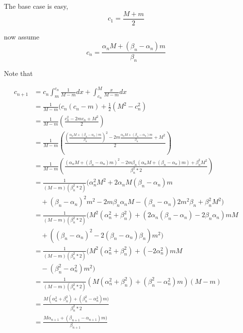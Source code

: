 \documentclass[12pt]{exam}
\begin{document}
\begin{questions}
\begin{enumerate}
\begin{solution}
The base case is easy,
\[c_1 = \frac{M + m}{2}\]

now assume 
\[c_n = \frac{\alpha_n M + (\beta_n - \alpha_n) m}{\beta_n}\]

Note that 
\end{solution}
\begin{solution}

\begin{align*}
    c_{n+1} &= c_{n}\int_{m}^{c_{n}} \frac{1}{M-m} dx + \int_{c_{n}}^M \frac{x}{M-m} dx\\
    &= \frac{1}{M-m}(c_{n}(c_{n} - m)  + \frac{1}{2}(M^2 - c_n^2) \\
    &= \frac{1}{M-m}(\frac{c_{n}^2 - 2m c_n + M^2}{2}) \\
    &= \frac{1}{M-m}(\frac{(\frac{\alpha_n M + (\beta_n - \alpha_n) m}{\beta_n})^2 - 2m \frac{\alpha_n M + (\beta_n - \alpha_n) m}{\beta_n} + M^2}{2}) \\
    &= \frac{1}{M-m}(\frac{(\alpha_n M + (\beta_n - \alpha_n) m)^2 - 2m \beta_n (\alpha_n M + (\beta_n - \alpha_n) m) + \beta_n^2 M^2}{\beta_n^2 * 2}) \\
    &= \frac{1}{(M-m)(\beta_n^2 * 2)}(\alpha_n^2 M^2 + 2\alpha_n M (\beta_n - \alpha_n) m\\
    &\quad +  (\beta_n - \alpha_n)^2 m^2 - 2m \beta_n \alpha_n M - (\beta_n - \alpha_n) 2m^2 \beta_n + \beta_n^2 M^2) \\
    &= \frac{1}{(M-m)(\beta_n^2 * 2)}(M^2(\alpha_n^2 + \beta_n^2) + (2\alpha_n (\beta_n - \alpha_n) - 2\beta_n \alpha_n )m M \\
    &\quad + ((\beta_n - \alpha_n)^2 - 2(\beta_n - \alpha_n)  \beta_n)m^2) \\
    &= \frac{1}{(M-m)(\beta_n^2 * 2)}(M^2(\alpha_n^2 + \beta_n^2) + (- 2\alpha_n^2 )m M \\
    &\quad - (\beta_n^2 - \alpha_n^2)m^2) \\
    &= \frac{1}{(M-m)(\beta_n^2 * 2)}(M(\alpha_n^2 + \beta_n^2) + (\beta_n^2 - \alpha_n^2)m)(M-m) \\
    &= \frac{M(\alpha_n^2 + \beta_n^2) + (\beta_n^2 - \alpha_n^2)m)}{\beta_n^2 * 2} \\
    &= \frac{M\alpha_{n+1} + (\beta_{n+1} - \alpha_{n+1})m)}{\beta_{n+1}} \\
\end{align*}

\end{solution}
\end{enumerate}


\newpage


\end{questions}
\end{document}

